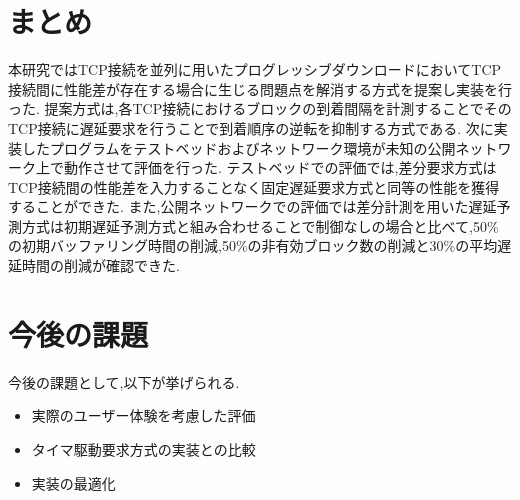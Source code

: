 \documentclass[a4j,12pt]{gradthesis_utf8}
\begin{document}
\section{まとめ}
本研究ではTCP接続を並列に用いたプログレッシブダウンロードにおいてTCP接続間に性能差が存在する場合に生じる問題点を解消する方式を提案し実装を行った.
提案方式は,各TCP接続におけるブロックの到着間隔を計測することでそのTCP接続に遅延要求を行うことで到着順序の逆転を抑制する方式である.
次に実装したプログラムをテストベッドおよびネットワーク環境が未知の公開ネットワーク上で動作させて評価を行った.
テストベッドでの評価では,差分要求方式はTCP接続間の性能差を入力することなく固定遅延要求方式と同等の性能を獲得することができた.
また,公開ネットワークでの評価では差分計測を用いた遅延予測方式は初期遅延予測方式と組み合わせることで制御なしの場合と比べて,50\%の初期バッファリング時間の削減,50\%の非有効ブロック数の削減と30\%の平均遅延時間の削減が確認できた.


\section{今後の課題}
\hspace*{0.5em}今後の課題として,以下が挙げられる.
\begin{itemize}
    \item 実際のユーザー体験を考慮した評価
    \item タイマ駆動要求方式の実装との比較
    \item 実装の最適化
\end{itemize}
\end{document}
